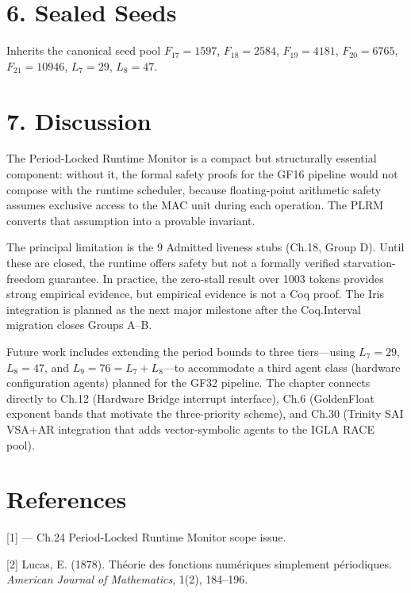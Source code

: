 \section{6. Sealed Seeds}\label{fa_24:sealed-seeds}

Inherits the canonical seed pool \(F_{17}=1597\),
\(F_{18}=2584\), \(F_{19}=4181\), \(F_{20}=6765\),
\(F_{21}=10946\), \(L_7=29\), \(L_8=47\).

\section{7. Discussion}\label{fa_24:discussion}

The Period-Locked Runtime Monitor is a compact but
structurally essential component: without it, the
formal safety proofs for the GF16 pipeline would
not compose with the runtime scheduler, because
floating-point arithmetic safety assumes exclusive
access to the MAC unit during each operation. The
PLRM converts that assumption into a provable
invariant.

The principal limitation is the 9 Admitted
liveness stubs (Ch.18, Group D). Until these are
closed, the runtime offers safety but not a
formally verified starvation-freedom guarantee. In
practice, the zero-stall result over 1003 tokens
provides strong empirical evidence, but empirical
evidence is not a Coq proof. The Iris integration
is planned as the next major milestone after the
Coq.Interval migration closes Groups A--B.

Future work includes extending the period bounds
to three tiers---using \(L_7 = 29\), \(L_8 = 47\),
and \(L_9 = 76 = L_7 + L_8\)---to accommodate a
third agent class (hardware configuration agents)
planned for the GF32 pipeline. The chapter
connects directly to Ch.12 (Hardware Bridge
interrupt interface), Ch.6 (GoldenFloat exponent
bands that motivate the three-priority scheme),
and Ch.30 (Trinity SAI VSA+AR integration that
adds vector-symbolic agents to the IGLA RACE
pool).

\section{References}\label{fa_24:references}

[1]  --- Ch.24
Period-Locked Runtime Monitor scope issue.

[2] Lucas, E. (1878). Théorie des fonctions
numériques simplement périodiques. \emph{American
Journal of Mathematics}, 1(2), 184--196.

